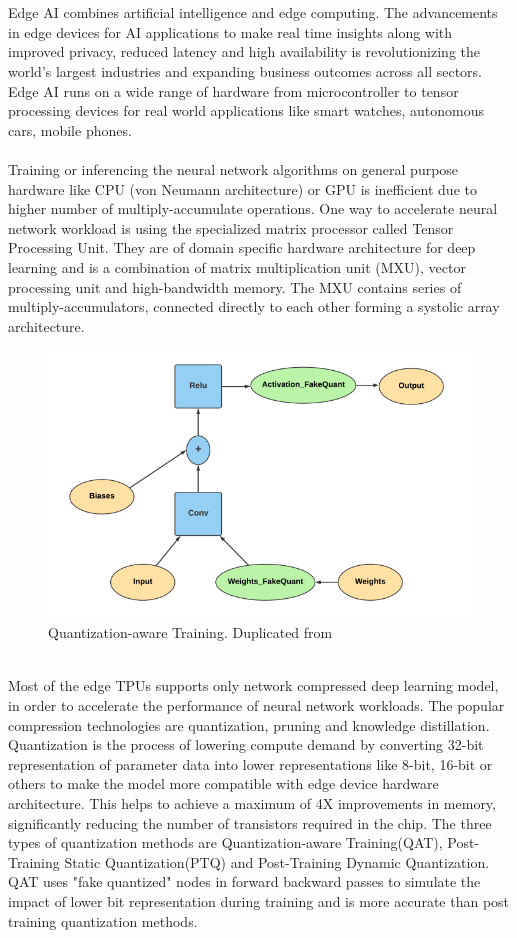 \documentclass[rnd]{mas_proposal}
\begin{document}
\\\\
Edge AI combines artificial intelligence and edge computing. The advancements in edge devices for AI applications to make real time insights along with improved privacy, reduced latency and high availability is revolutionizing the world's largest industries and expanding business outcomes across all sectors. Edge AI runs on a wide range of hardware from microcontroller to tensor processing devices for real world applications like smart watches, autonomous cars, mobile phones.
\\\\
Training or inferencing the neural network algorithms on general purpose hardware like CPU (von Neumann architecture) or GPU is inefficient due to higher number of multiply-accumulate operations\cite{hubara2017quantized}. One way to accelerate neural network workload is using the specialized matrix processor called Tensor Processing Unit. They are of domain specific hardware architecture for deep learning and is a combination of matrix multiplication unit (MXU), vector processing unit and high-bandwidth memory. The MXU contains series of multiply-accumulators, connected directly to each other forming a systolic array architecture. 
\begin{figure}[h!]
    \includegraphics[width=\textwidth]{images/QAT.png}
    \caption{Quantization-aware Training. Duplicated from \cite{qunatifi}}
    \label{fig:myfigure}
\end{figure}
\\
Most of the edge TPUs supports only network compressed deep learning model, in order to accelerate the performance of neural network workloads. The popular compression technologies are quantization, pruning and knowledge distillation. Quantization is the process of lowering compute demand by converting 32-bit representation of parameter data into lower representations like 8-bit, 16-bit or others to make the model more compatible with edge device hardware architecture. This helps to achieve a maximum of 4X improvements in memory, significantly reducing the number of transistors required in the chip. The three types of quantization methods are Quantization-aware Training(QAT), Post-Training Static Quantization(PTQ) and Post-Training Dynamic Quantization. QAT uses "fake quantized" nodes in forward backward passes to simulate the impact of lower bit representation during training and is more accurate than post training quantization methods.
\end{document}
